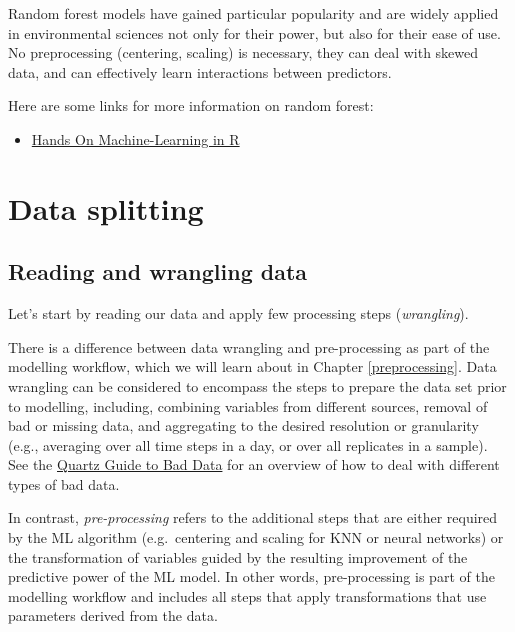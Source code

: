 \documentclass[
]{book}
\providecommand{\tightlist}{%
  \setlength{\itemsep}{0pt}\setlength{\parskip}{0pt}}
\begin{document}
Random forest models have gained particular popularity and are widely applied in environmental sciences not only for their power, but also for their ease of use. No preprocessing (centering, scaling) is necessary, they can deal with skewed data, and can effectively learn interactions between predictors.

Here are some links for more information on random forest:

\begin{itemize}
\tightlist
\item
  \href{https://bradleyboehmke.github.io/HOML/random-forest.html}{Hands On Machine-Learning in R}
\end{itemize}

\hypertarget{data-splitting}{%
\chapter{Data splitting}\label{data-splitting}}

\hypertarget{reading-and-wrangling-data}{%
\section{Reading and wrangling data}\label{reading-and-wrangling-data}}

Let's start by reading our data and apply few processing steps (\emph{wrangling}).

There is a difference between data wrangling and pre-processing as part of the modelling workflow, which we will learn about in Chapter \ref{preprocessing}. Data wrangling can be considered to encompass the steps to prepare the data set prior to modelling, including, combining variables from different sources, removal of bad or missing data, and aggregating to the desired resolution or granularity (e.g., averaging over all time steps in a day, or over all replicates in a sample). See the \href{https://github.com/Quartz/bad-data-guide}{Quartz Guide to Bad Data} for an overview of how to deal with different types of bad data.

In contrast, \emph{pre-processing} refers to the additional steps that are either required by the ML algorithm (e.g.~centering and scaling for KNN or neural networks) or the transformation of variables guided by the resulting improvement of the predictive power of the ML model. In other words, pre-processing is part of the modelling workflow and includes all steps that apply transformations that use parameters derived from the data.
\end{document}
